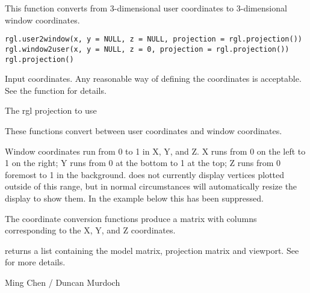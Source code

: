 \documentclass{article}
\begin{document}
\begin{Description}\relax
This function converts from 3-dimensional user coordinates
to 3-dimensional window coordinates.
\end{Description}
\begin{Usage}
\begin{verbatim}
rgl.user2window(x, y = NULL, z = NULL, projection = rgl.projection())
rgl.window2user(x, y = NULL, z = 0, projection = rgl.projection())
rgl.projection()
\end{verbatim}
\end{Usage}
\begin{Arguments}
\begin{ldescription}
\item[\code{x, y, z}] Input coordinates.  Any reasonable way of defining the
coordinates is acceptable.  See the function 
for details.
\item[\code{projection}] The rgl projection to use 
\end{ldescription}
\end{Arguments}
\begin{Details}\relax
These functions convert between user coordinates and window coordinates.

Window coordinates run from 0 to 1 in X, Y, and Z.  X runs from 0 on the
left to 1 on the right; Y runs from 0 at the bottom to 1 at the top;
Z runs from 0 foremost to 1 in the background.   does not currently
display vertices plotted outside of this range, but in normal circumstances will automatically resize the
display to show them.  In the example below this has been suppressed.
\end{Details}
\begin{Value}
The coordinate conversion functions produce a matrix with columns corresponding 
to the X, Y, and Z coordinates.

 returns a list containing the model matrix, projection matrix
and viewport.  See  for more details.
\end{Value}
\begin{Author}\relax
Ming Chen / Duncan Murdoch
\end{Author}
\begin{SeeAlso}\relax
{}
\end{SeeAlso}
\begin{Examples}
\end{Examples}
\end{document}
